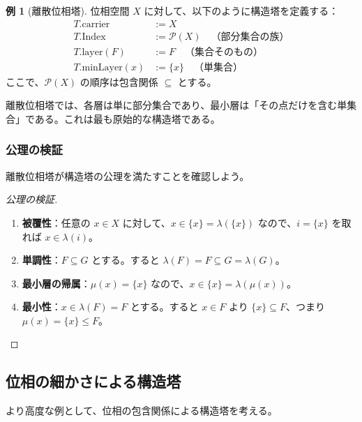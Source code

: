 \documentclass[a4paper,11pt,ja=standard]{bxjsarticle}
\theoremstyle{definition}
\newtheorem{example}[definition]{例}
\begin{document}
\begin{example}[離散位相塔]
位相空間 $X$ に対して、以下のように構造塔を定義する：
\begin{align*}
T.\text{carrier} &:= X \\
T.\text{Index} &:= \mathcal{P}(X) \quad \text{（部分集合の族）} \\
T.\text{layer}(F) &:= F \quad \text{（集合そのもの）} \\
T.\text{minLayer}(x) &:= \{x\} \quad \text{（単集合）}
\end{align*}
ここで、$\mathcal{P}(X)$ の順序は包含関係 $\subseteq$ とする。
\end{example}

\begin{geometric}
離散位相塔では、各層は単に部分集合であり、最小層は「その点だけを含む単集合」である。これは最も原始的な構造塔である。
\end{geometric}

\subsubsection{公理の検証}

離散位相塔が構造塔の公理を満たすことを確認しよう。

\begin{proof}[公理の検証]
\begin{enumerate}
    \item \textbf{被覆性}：任意の $x \in X$ に対して、$x \in \{x\} = \lambda(\{x\})$ なので、$i = \{x\}$ を取れば $x \in \lambda(i)$。

    \item \textbf{単調性}：$F \subseteq G$ とする。すると $\lambda(F) = F \subseteq G = \lambda(G)$。

    \item \textbf{最小層の帰属}：$\mu(x) = \{x\}$ なので、$x \in \{x\} = \lambda(\mu(x))$。

    \item \textbf{最小性}：$x \in \lambda(F) = F$ とする。すると $x \in F$ より $\{x\} \subseteq F$、つまり $\mu(x) = \{x\} \leq F$。
\end{enumerate}
\end{proof}

\subsection{位相の細かさによる構造塔}

より高度な例として、位相の包含関係による構造塔を考える。
\end{document}

